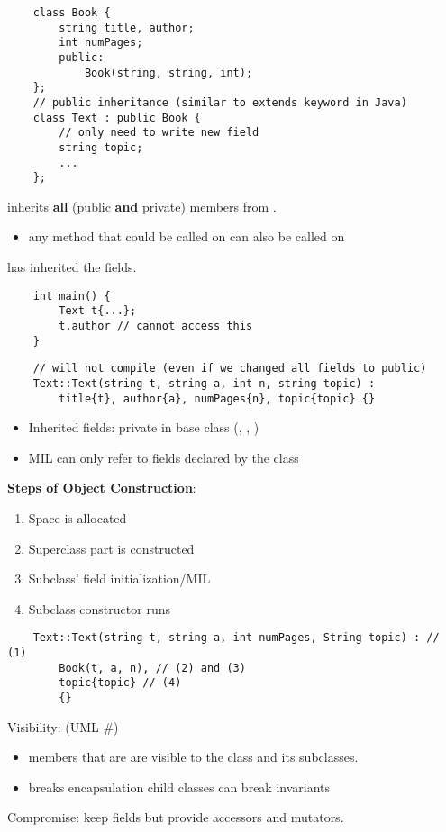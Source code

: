 \begin{lstlisting}
    class Book {
        string title, author;
        int numPages;
        public:
            Book(string, string, int);
    };
    // public inheritance (similar to extends keyword in Java)
    class Text : public Book {
        // only need to write new field
        string topic;
        ...
    };
\end{lstlisting}

 inherits \textbf{all} (public \textbf{and} private)
members from .
\begin{itemize}
    \item any method that could be called on  can also
          be called on 
\end{itemize}
 has inherited the  fields.
\begin{lstlisting}
    int main() {
        Text t{...};
        t.author // cannot access this
    }
\end{lstlisting}

\begin{lstlisting}
    // will not compile (even if we changed all fields to public)
    Text::Text(string t, string a, int n, string topic) :
        title{t}, author{a}, numPages{n}, topic{topic} {}
\end{lstlisting}
\begin{itemize}
    \item Inherited fields: private in base class (, ,
          )
    \item MIL can only refer to fields declared by the class
\end{itemize}

\textbf{Steps of Object Construction}:
\begin{enumerate}[(1)]
    \item Space is allocated
    \item Superclass part is constructed
    \item Subclass' field initialization/MIL
    \item Subclass constructor runs
\end{enumerate}

\begin{lstlisting}
    Text::Text(string t, string a, int numPages, String topic) : // (1)
        Book(t, a, n), // (2) and (3)
        topic{topic} // (4)
        {}
\end{lstlisting}

Visibility:  (UML \#)
\begin{itemize}
    \item members that are  are visible to the class
          and its subclasses.
    \item breaks encapsulation
          \subitem child classes can break invariants
\end{itemize}
Compromise: keep fields  but provide 
accessors and mutators.


